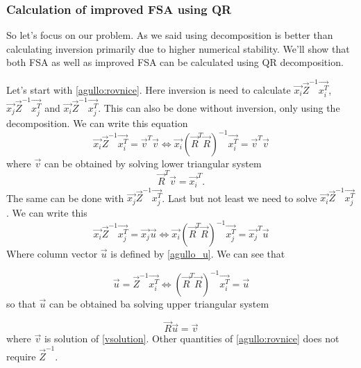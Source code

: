 
\subsubsection*{Calculation of improved FSA using QR}
So let's focus on our problem. As we said using decomposition is better than calculating inversion primarily due to higher numerical stability. 
We'll show that both FSA as well as improved FSA can be calculated using QR decomposition.

Let's start with \ref{agullo:rovnice}. Here inversion is need to calculate 
$\vec{x_i}\vec{Z}^{-1}\vec{x_i^T}$, $\vec{x_j}\vec{Z}^{-1}\vec{x_j^T}$ and $\vec{x_i}\vec{Z}^{-1}\vec{x_j^T}$. This can also be done without inversion, only using the decomposition. We can write this equation
\begin{equation} \label{solveimi}
	\vec{x_i}\vec{Z}^{-1}\vec{x_i^T} = \vec{v}^T\vec{v} 	\iff \vec{x_i}(\vec{R}^T\vec{R})^{-1}\vec{x_i^T} = \vec{v}^T\vec{v}
\end{equation} 
where $\vec{v}$ can be obtained by solving lower triangular system
\begin{equation} \label{vsolution}
	\vec{R}^T\vec{v} = \vec{x_i}^T.
\end{equation} 
The same can be done with  $\vec{x_j}\vec{Z}^{-1}\vec{x_j^T}$. Last but not least we need to solve 
$\vec{x_i}\vec{Z}^{-1}\vec{x_j^T}$. We can write this 
\begin{equation}
	\vec{x_i}\vec{Z}^{-1}\vec{x_j^T} = \vec{x_j}\vec{u} 	\iff \vec{x_i}(\vec{R}^T\vec{R})^{-1}\vec{x_j^T} = \vec{x_j}^T\vec{u}
\end{equation} 
Where column vector $\vec{u}$ is defined by \ref{agullo_u}. We can see that 

\begin{equation}
	\vec{u} = \vec{Z}^{-1}\vec{x_i^T} 	\iff (\vec{R}^T\vec{R})^{-1}\vec{x_i^T} = \vec{u}
\end{equation}
so that $\vec{u}$ can be obtained ba solving upper triangular system 

\begin{equation} \label{solve_u_qr}
	\vec{R}\vec{u} = \vec{v}
\end{equation}
where $\vec{v}$ is solution of \ref{vsolution}. Other quantities of \ref{agullo:rovnice} does not require $\vec{Z}^{-1}$.

